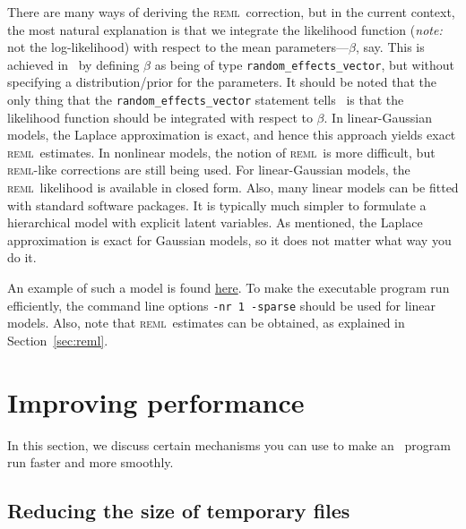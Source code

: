 \documentclass{admbmanual}
\newcommand{\scREML}{\textsc{reml}}
\begin{document}
There are many ways of deriving the \scREML\ correction, but in the current
context, the most natural explanation is that we integrate the likelihood
function (\textit{note:} not the log-likelihood) with respect to the mean
parameters---$\beta$, say. This is achieved in \scAR\ by defining $\beta$ as
being of type \texttt{random\_effects\_vector}, but without specifying a
distribution/prior for the parameters. It should be noted that the only thing
that the \texttt{random\_effects\_vector} statement tells \scAR\ is that the
likelihood function should be integrated with respect to $\beta$. In
linear-Gaussian models, the Laplace approximation is exact, and hence this
approach yields exact \scREML\ estimates. In nonlinear models, the notion of
\scREML\ is more difficult, but \scREML-like corrections are still being used.
For linear-Gaussian models, the \scREML\ likelihood is available in closed form.
Also, many linear models can be fitted with standard software packages. It is
typically much simpler to formulate a hierarchical model with explicit latent
variables. As mentioned, the Laplace approximation is exact for Gaussian models,
so it does not matter what way you do it.

An example of such a model is found
\href{http://www.admb-project.org/otter-research/admbre/examples/bcb/bcb.html}{here}. To make the
executable program run efficiently, the command line options
\texttt{-nr 1 -sparse} should be used for linear models. Also, note that
\scREML\ estimates can be obtained, as explained in Section~\ref{sec:reml}.

\section{Improving performance}
\label{sec:improving}

In this section, we discuss certain mechanisms you can use to make an \scAR\
program run faster and more smoothly.

\subsection{Reducing the size of temporary files}
\label{Memory_management}
\end{document}
